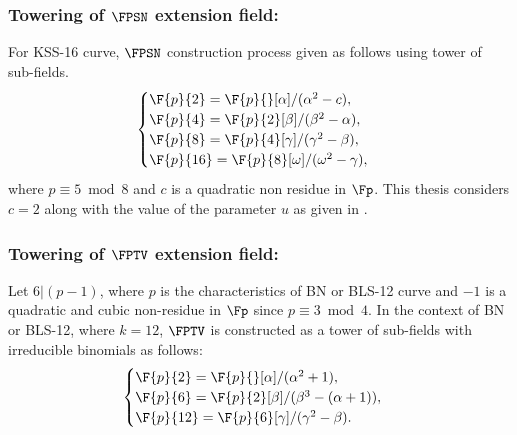 \subsubsection{Towering of $\FPSN$ extension field:}
 For KSS-16 curve, $\FPSN$ construction process given as follows using tower of sub-fields. 
\begin{equation}\label{towering}
\begin{cases}
\F{p}{2} = \F{p}{}[\alpha]/(\alpha^2-c),  \\ 
\F{p}{4} = \F{p}{2}[\beta]/(\beta^2-\alpha),  \\ 
\F{p}{8} = \F{p}{4}[\gamma]/(\gamma^2-\beta), \\ 
\F{p}{16} = \F{p}{8}[\omega]/(\omega^2-\gamma), \\ 
\end{cases}
\end{equation}
where  $p \equiv 5 \bmod 8$  and $c$ is a quadratic non residue in $\Fp$. This thesis considers  $c = 2$ along with the value of 
the parameter $u$ as given in \cite{sylvain_new_param}. 

\subsubsection*{Towering of $\FPTV$ extension field:}
Let $6|(p-1)$, where $p$ is the characteristics of BN or BLS-12 curve and $-1$ is a quadratic and cubic non-residue in $\Fp$ since $p \equiv 3 \bmod 4$. 
In the context of BN or BLS-12, where $k=12$, $\FPTV$ is constructed as  a tower of sub-fields with irreducible binomials as follows:
\begin{equation}\label{BN_towering}
\begin{cases}
\F{p}{2} = \F{p}{}[\alpha]/(\alpha^2+1),  \\ 
\F{p}{6} = \F{p}{2}[\beta]/(\beta^3-(\alpha+1)),  \\ 
\F{p}{12} = \F{p}{6}[\gamma]/(\gamma^2-\beta). \\ 
\end{cases}
\end{equation}

